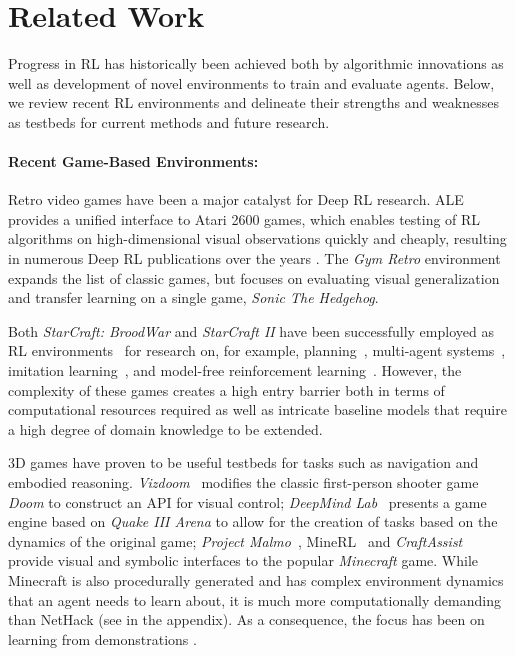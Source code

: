 \documentclass{article}
\newcommand{\nethack}{NetHack}
\begin{document}
\section{Related Work}

Progress in RL has historically been achieved both by algorithmic
innovations as well as development of novel environments to train and
evaluate agents. Below, we review recent RL environments and delineate their strengths and weaknesses as testbeds for current methods and future
research.

\paragraph{Recent Game-Based Environments:}
Retro video games have been a major catalyst for Deep RL research. ALE~\citep{DBLP:journals/jair/BellemareNVB13} provides a
unified interface to Atari 2600 games, which enables testing of RL algorithms
on high-dimensional visual observations quickly and cheaply,
resulting in numerous Deep RL publications over the years \citep{arulkumaran2017deep}. The
\emph{Gym Retro} environment \citep{nichol2018gotta} expands the list
of classic games, but focuses on
evaluating visual generalization and transfer learning on a single
game, \emph{Sonic The Hedgehog}.

Both \emph{StarCraft: BroodWar} and \emph{StarCraft II} have been
successfully employed as RL environments~\citep{synnaeve2016torchcraft, vinyals2017starcraft} for
research on, for example, planning~\citep{ontanon2013survey,nardelli2018value}, multi-agent systems~\citep{foerster2017stabilising, samvelyan2019starcraft}, imitation
learning~\citep{vinyals2019grandmaster}, and model-free reinforcement
learning~\citep{vinyals2019grandmaster}. However,
the complexity of these games creates a high entry barrier both in
terms of computational resources required as well as intricate baseline
models that require a high degree of domain knowledge to be extended.

3D games have proven to be useful testbeds for tasks such as
navigation and embodied
reasoning. \emph{Vizdoom}~\citep{kempka2016vizdoom} modifies the
classic first-person shooter game \emph{Doom} to construct an API for
visual control; \emph{DeepMind
  Lab}~\citep{DBLP:journals/corr/BeattieLTWWKLGV16} presents a game
engine based on \emph{Quake III Arena} to allow for the creation of
tasks based on the dynamics of the original game; \emph{Project
  Malmo}~\citep{DBLP:conf/ijcai/JohnsonHHB16}, MineRL~\citep{guss2019minerlcomp} and
\emph{CraftAssist}~\citep{DBLP:journals/corr/abs-1905-01978} provide
visual and symbolic interfaces to the popular \emph{Minecraft} game.
While Minecraft is also procedurally generated and has complex environment dynamics that an agent needs to learn about, it is much more computationally demanding than
\nethack{} (see  in the appendix). As a consequence, the focus has been on learning from demonstrations \citep{guss2019minerlcomp}.
\end{document}

